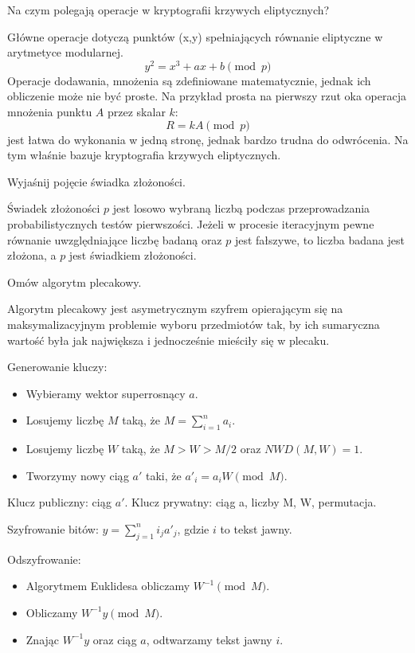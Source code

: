 \documentclass[answers,11pt]{exam}
\begin{document}
\begin{questions}
\question Na czym polegają operacje w kryptografii krzywych eliptycznych?
\begin{solution}
Główne operacje dotyczą punktów (x,y) spełniających równanie eliptyczne w arytmetyce modularnej. 
\begin{equation}
y^2 = x^3 + ax +b \pmod{p}
\end{equation}
Operacje dodawania, mnożenia są zdefiniowane matematycznie, jednak ich obliczenie może nie być proste. Na przykład prosta na pierwszy rzut oka operacja mnożenia punktu $A$ przez skalar $k$:
\begin{equation}
R = k A \pmod{p}
\end{equation}
jest łatwa do wykonania w jedną stronę, jednak bardzo trudna do odwrócenia. Na tym właśnie bazuje kryptografia krzywych eliptycznych.

\end{solution}

\question Wyjaśnij pojęcie świadka złożoności.
\begin{solution}
Świadek złożoności $p$ jest losowo wybraną liczbą podczas
przeprowadzania probabilistycznych testów pierwszości. Jeżeli w
procesie iteracyjnym pewne równanie uwzględniające liczbę badaną oraz
$p$ jest fałszywe, to liczba badana jest złożona, a $p$ jest świadkiem
złożoności.
\end{solution}

\question Omów algorytm plecakowy.
\begin{solution}
Algorytm plecakowy jest asymetrycznym szyfrem opierającym się na maksymalizacyjnym problemie wyboru przedmiotów tak, by ich sumaryczna wartość była jak największa i jednocześnie mieściły się w plecaku.

Generowanie kluczy:
\begin{itemize}
\item Wybieramy wektor superrosnący $a$.
\item Losujemy liczbę $M$ taką, że $M = \sum_{i=1}^{n} a_i$.
\item Losujemy liczbę $W$ taką, że $M > W > M/2$ oraz $NWD(M,W) = 1$.
\item Tworzymy nowy ciąg $a'$ taki, że $a'_i = a_iW \pmod M$.
\end{itemize}
Klucz publiczny: ciąg $a'$.
Klucz prywatny: ciąg a, liczby M, W, permutacja.

Szyfrowanie bitów: $y = \sum_{j=1}^{n} i_ja'_j$, gdzie $i$ to tekst jawny.

Odszyfrowanie:
\begin{itemize}
\item Algorytmem Euklidesa obliczamy $W^{-1} \pmod M$.
\item Obliczamy $W^{-1}y \pmod M$.
\item Znając $W^{-1}y$ oraz ciąg $a$, odtwarzamy tekst jawny $i$. 
\end{itemize}
\end{solution}

\end{questions}
\end{document}
